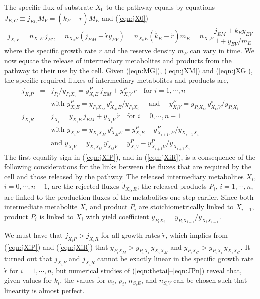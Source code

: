 The specific flux of substrate $X_0$ to the pathway equals by equations 
$\dot{J}_{E,C} \equiv j_{EC} M_V = (\dot{k}_E - \dot{r}) M_E$
and (\ref{eqn:jX0})
\begin{equation}\label{eqn:jX0F}
  j_{X_0 F} = n_{X_0E} \, j_{EC} = 
  n_{X_0E} (j_{EM} + \dot{r} y_{EV}) =
  n_{X_0E} (\dot{k}_E - \dot{r}) m_E =
  n_{X_0E} \frac{j_{EM} + \dot{k}_E y_{EV}} {1 + y_{EV}/ m_E}  
\end{equation}
where the specific growth rate $\dot{r}$ and the reserve density $m_E$ can vary in time. We now equate the release of intermediary metabolites and products from the pathway to their use by the cell. 
Given (\ref{eqn:MG}), (\ref{eqn:jXM}) and (\ref{eqn:jXG}), the specific required fluxes of intermediary metabolites and products are,
\begin{eqnarray}\label{eqn:jXiP}
  j_{X_i P}  &=& j_{P_i}/ y_{P_i X_i} = 
  y_{X_i E}^P \, j_{EM} + y_{X_i V}^P \, \dot{r} \quad
  \mbox{for } i = 1, \cdots, n
\\\nonumber && \mbox{with }
  y_{X_i E}^P = y_{P_i X_M} \, y_{X_M E}^\circ/ y_{P_i X_i} 
\quad \mbox{ and } \quad 
  y_{X_i V}^P = y_{P_i X_G} \, y_{X_G V}^\circ/ y_{P_i X_i} 
\\\label{eqn:jXiR}
  j_{X_i R}  &=& j_{X_i} = y_{X_i E} \, j_{EM} + y_{X_i V} \, \dot{r} \quad
  \mbox{for } i = 0, \cdots, n - 1
\\\nonumber && \mbox{with }
  y_{X_i E} = y_{X_i X_M} \, y_{X_M E}^\circ =
  y_{X_i E}^P - y_{X_{i + 1}, E}^P/ y_{X_{i + 1} X_i}
\\\nonumber && \mbox{and }
  y_{X_i V} = y_{X_i X_G} \, y_{X_G V}^\circ =
  y_{X_i V}^P - y_{X_{i + 1} V}^P/ y_{X_{i + 1} X_i}
\end{eqnarray}
The first equality sign in (\ref{eqn:jXiP}), and in (\ref{eqn:jXiR}), is a consequence of the following considerations for the links between the fluxes that are required by the cell and those released by the pathway. 
The released intermediary metabolites $X_i$, $i = 0, \cdots, n-1$, are the rejected fluxes $\dot{J}_{X_i, R}$; 
the released products $P_i$, $i = 1, \cdots, n$, are linked to the production fluxes of the metabolites one step earlier. 
Since both intermediate metabolite $X_i$ and product $P_i$ are stoichiometrically linked to $X_{i-1}$, product $P_i$ is linked to $X_i$ with yield coefficient 
$y_{P_i X_i} = y_{P_i X_{i-1}}/ y_{X_i X_{i-1}}$.

We must have that $j_{X_i P} > j_{X_i R}$ for all growth rates $\dot{r}$, which implies from (\ref{eqn:jXiP}) and (\ref{eqn:jXiR}) that 
$y_{P_i X_M} > y_{P_i X_i} \, y_{X_i X_M}$ 
and 
$y_{P_i X_G} > y_{P_i X_i} \, y_{X_i X_G}$. 
It turned out that $j_{X_i P}$ and $j_{X_i R}$ cannot be exactly linear in the specific growth rate $\dot{r}$ \cite{KooySege2005} for $i = 1, \cdots, n$, but numerical studies of (\ref{eqn:thetai}--\ref{eqn:JPn}) reveal that, given values for $\dot{k}_i$, the values for $\alpha_i$, $\rho_i$, $n_{S_iE}$, and $n_{S_iV}$ can be chosen such that linearity is almost perfect.

